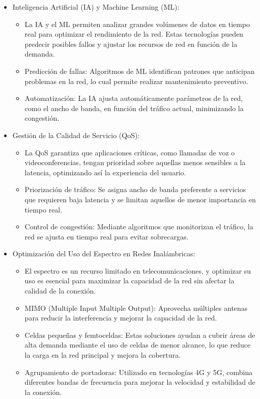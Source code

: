 \documentclass[12pt]{article}
\begin{document}
\begin{itemize}
    \item Inteligencia Artificial (IA) y Machine Learning (ML):
    \begin{itemize}
        \item La IA y el ML permiten analizar grandes volúmenes de datos en tiempo real para optimizar el rendimiento de la red. Estas tecnologías 
        pueden predecir posibles fallos y ajustar los recursos de red en función de la demanda.
        \item Predicción de fallas: Algoritmos de ML identifican patrones que anticipan problemas en la red, lo cual permite realizar mantenimiento 
        preventivo.
        \item Automatización: La IA ajusta automáticamente parámetros de la red, como el ancho de banda, en función del tráfico actual, 
        minimizando la congestión. 
    \end{itemize}

    \item Gestión de la Calidad de Servicio (QoS):
    \begin{itemize}
        \item La QoS garantiza que aplicaciones críticas, como llamadas de voz o videoconferencias, tengan prioridad sobre aquellas menos 
        sensibles a la latencia, optimizando así la experiencia del usuario.
        \item Priorización de tráfico: Se asigna ancho de banda preferente a servicios que requieren baja latencia y se limitan aquellos de
        menor importancia en tiempo real.
        \item Control de congestión: Mediante algoritmos que monitorizan el tráfico, la red se ajusta en tiempo real para evitar sobrecargas.
    \end{itemize}


    \item Optimización del Uso del Espectro en Redes Inalámbricas:
    \begin{itemize}
        \item El espectro es un recurso limitado en telecomunicaciones, y optimizar su uso es esencial para maximizar la capacidad de la red 
        sin afectar la calidad de la conexión.
        \item MIMO (Multiple Input Multiple Output): Aprovecha múltiples antenas para reducir la interferencia y mejorar la capacidad de la red.
        \item Celdas pequeñas y femtoceldas: Estas soluciones ayudan a cubrir áreas de alta demanda mediante el uso de celdas de menor alcance, 
        lo que reduce la carga en la red principal y mejora la cobertura.
        \item Agrupamiento de portadoras: Utilizado en tecnologías 4G y 5G, combina diferentes bandas de frecuencia para mejorar la velocidad 
        y estabilidad de la conexión.
    \end{itemize}


\end{itemize}
\end{document}

